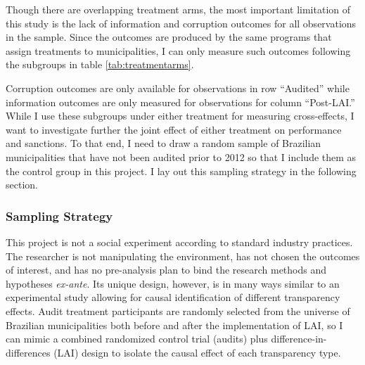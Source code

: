 \documentclass[11pt]{article}
\begin{document}
Though there are overlapping treatment arms, the most important limitation of this study is the lack of information and corruption outcomes for all observations in the sample. Since the outcomes are produced by the same programs that assign treatments to municipalities, I can only measure such outcomes following the subgroups in table \ref{tab:treatmentarms}.



Corruption outcomes are only available for observations in row ``Audited'' while information outcomes are only measured for observations for column ``Post-LAI.'' While I use these subgroups under either treatment for measuring cross-effects, I want to investigate further the joint effect of either treatment on performance and sanctions. To that end, I need to draw a random sample of Brazilian municipalities that have not been audited prior to 2012 so that I include them as the control group in this project. I lay out this sampling strategy in the following section.

\subsubsection{Sampling Strategy} \label{subsec:sampling_paper3}

This project is not a social experiment according to standard industry practices. The researcher is not manipulating the environment, has not chosen the outcomes of interest, and has no pre-analysis plan to bind the research methods and hypotheses \emph{ex-ante}. Its unique design, however, is in many ways similar to an experimental study allowing for causal identification of different transparency effects. Audit treatment participants are randomly selected from the universe of Brazilian municipalities both before and after the implementation of LAI, so I can mimic a combined randomized control trial (audits) plus difference-in-differences (LAI) design to isolate the causal effect of each transparency type.
\end{document}
